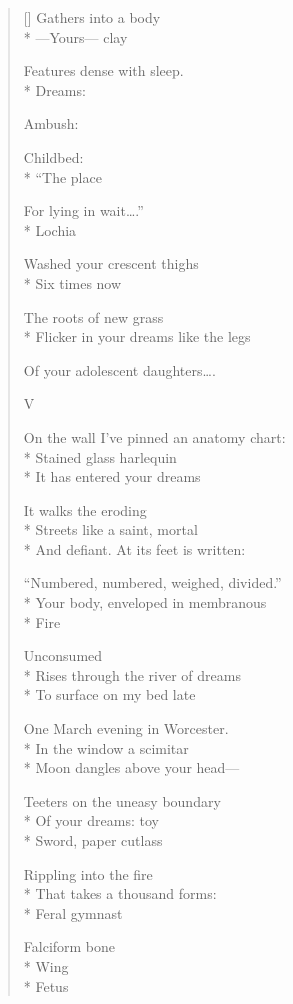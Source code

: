 \begin{verse}[\versewidth]
Gathers into a body\\*
---Yours--- \qquad clay

Features dense with sleep.\\*
Dreams:

Ambush:

Childbed:\\*
 \qquad ``The place

For lying in wait\ldots .''\\*
Lochia

Washed your crescent thighs\\*
Six times \qquad now

The roots of new grass\\*
Flicker in your dreams like the legs

Of your adolescent daughters\ldots .

                                    V

On the wall I've pinned an anatomy chart: \\*
Stained glass harlequin\\*
It has entered your dreams

It walks the eroding \\*
Streets   like a saint, mortal\\*
And defiant. \qquad At its feet is written:

``Numbered, numbered, weighed, divided.''\\*
Your body, enveloped in membranous\\*
Fire

Unconsumed\\*
Rises through the river of dreams\\*
To surface on my bed late

One March evening in Worcester.\\*
In the window a scimitar \\*
Moon dangles above your head---

Teeters on the uneasy boundary\\*
Of your dreams: toy\\*
Sword, paper cutlass

Rippling into the fire\\*
That takes a thousand forms:\\*
Feral gymnast

Falciform bone\\*
Wing\\*
Fetus
\end{verse}
